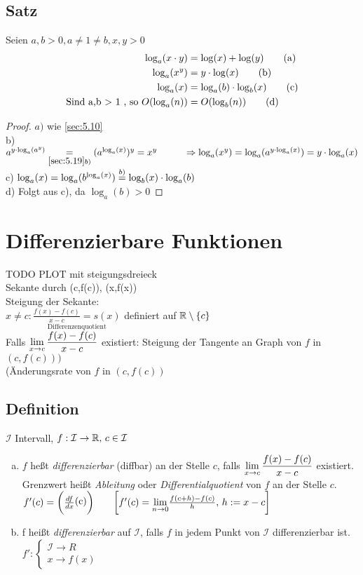 \subsection[Satz:]{Satz}
Seien $a,b > 0 , a \neq 1 \neq b , x , y > 0$
\begin{align}
\log_a(x\cdot y) &= \log(x) + \log(y) \tag{a}\\
\log_a(x^y) &= y \cdot \log(x) \tag{b}\\
\log_a(x) &= \log_a(b) \cdot \log_b(x) \tag{c}\\
\text{Sind a,b > 1 , so } O(\log_a(n)) &= O(\log_b(n)) \tag{d}
\end{align}
\begin{proof}
$a)$ wie \ref{sec:5.10}\\
b) $a^{y \cdot \log_a(a^y)} \underset{\ref{sec:5.19}b)}{=}(a^{\log_a(x)})^{y} = x^y\\
\hspace*{1cm} \Rightarrow \log_a(x^y) = \log_a(a^{y \cdot \log_a(x)}) = y \cdot \log_a(x)$\\
c) $\log_a(x) = \log_a(b^{\log_a(x)}) \overset{b)}{=} \log_b(x) \cdot \log_a(b)$\\
d) Folgt aus c), da $\log_a(b) > 0$
\end{proof}
\section{Differenzierbare Funktionen}
TODO PLOT mit steigungsdreieck\\
Sekante durch (c,f(c)), (x,f(x))\\
Steigung der Sekante:\\
$x \neq c: \underset{\text{Differenzenquotient}}{\frac{f(x) -f(c)}{x-c} =s(x)}$ definiert auf $\mathbb{R} \setminus \{c\}$\\
Falls $\displaystyle \lim_{x \to c} \frac{f(x)-f(c)}{x-c}$ existiert: Steigung der Tangente an Graph von $f$ in $(c,f(c)))$\\
(Änderungsrate von $f$ in $(c,f(c))$
\subsection{Definition}
$\mathcal{I}$ Intervall, $f: \mathcal{I} \to \mathbb{R} ,\, c \in \mathcal{I}$
\begin{enumerate}[a)]
\item $f$ he\ss t {\em differenzierbar} (diffbar) an der Stelle $c$, falls $\displaystyle \lim_{x \to c} \frac{f(x)-f(c)}{x-c}$ existiert.\\
Grenzwert hei\ss t \emph{Ableitung} oder \emph{Differentialquotient} von $f$ an der Stelle $c$.\\
$f'(c) = \biggl( \frac{df}{dx} \raisebox{1pt}{(c)} \biggr) \qquad
\biggl\lbrack f'(c) = {\displaystyle \lim_{n \to 0}} \frac{f(c+h) -f(c)}{h},\, h := x-c \biggr\rbrack$
\item f hei\ss t \emph{differenzierbar} auf $\mathcal{I}$, falls $f$ in jedem Punkt von $\mathcal{I}$ differenzierbar ist.\\
$f' :\begin{cases}
\mathcal{I} \to R\\
x \to f(x)
\end{cases}$
\end{enumerate}
